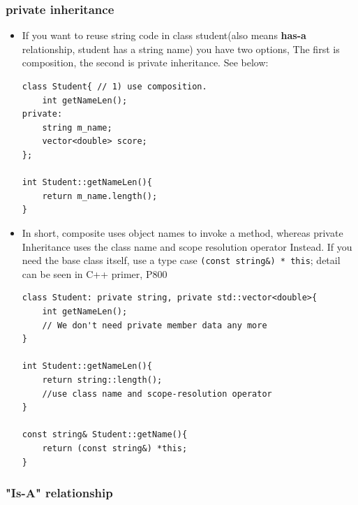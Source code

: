 \documentclass[a4paper,11pt,twoside]{book}
\begin{document}
\subsubsection{private inheritance}
\begin{itemize}
    \item If you want to reuse string code in class student(also means \textbf{has-a} relationship, student has a string name) you have two options, The first is composition,  the second is private inheritance. See below:
\begin{lstlisting}[numbers=none]
class Student{ // 1) use composition.
	int getNameLen();
private:
	string m_name;
	vector<double> score;
};

int Student::getNameLen(){
	return m_name.length();
}
\end{lstlisting}

\item In short, composite uses object names to invoke a method, whereas private Inheritance uses the class name and scope resolution operator Instead. If you need the base class itself, use a type case \texttt{(const string\&) * this}; detail can be seen in C++ primer, P800
\begin{lstlisting}[numbers=none]
class Student: private string, private std::vector<double>{
	int getNameLen();
	// We don't need private member data any more
}

int Student::getNameLen(){
	return string::length();
	//use class name and scope-resolution operator
}

const string& Student::getName(){
	return (const string&) *this;
}
\end{lstlisting}
\end{itemize}

\subsubsection{"Is-A" relationship}
\end{document}
